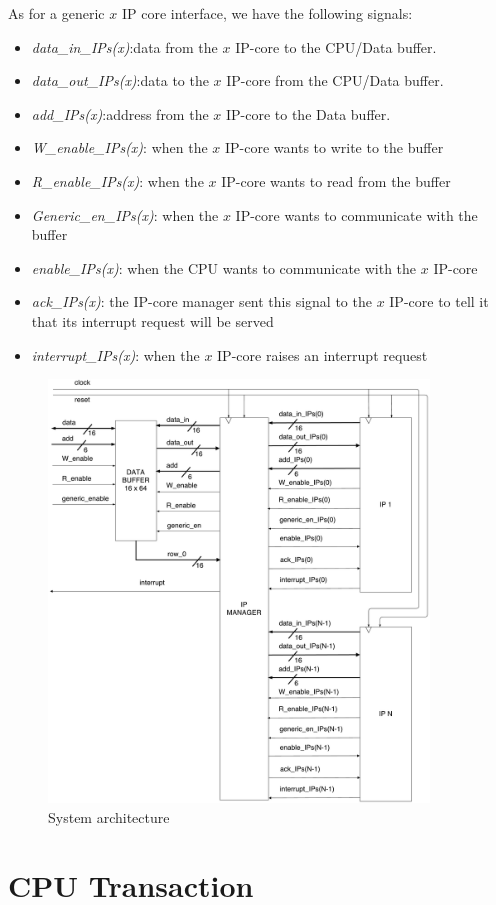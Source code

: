 	As for a generic $ x $ IP core interface, we have the following signals:
	\begin{itemize}
	\item \textit{data\_in\_IPs(x)}:data from the $ x $ IP-core to the CPU/Data buffer.
\item \textit{data\_out\_IPs(x)}:data to the $ x $ IP-core from the CPU/Data buffer.
\item \textit{add\_IPs(x)}:address from the $ x $ IP-core to the Data buffer.
\item \textit{W\_enable\_IPs(x)}: when the $ x $ IP-core wants to write to the buffer
\item \textit{R\_enable\_IPs(x)}: when the $ x $ IP-core wants to read from the buffer
\item \textit{Generic\_en\_IPs(x)}: when the $ x $ IP-core wants to communicate with the buffer	
\item \textit{enable\_IPs(x)}: when the CPU wants to communicate with the $ x $ IP-core
\item \textit{ack\_IPs(x)}: the IP-core manager sent this signal to the $ x $ IP-core to tell it that its interrupt request will be served
\item \textit{interrupt\_IPs(x)}: when the $ x $ IP-core raises an interrupt request
\end{itemize}
	\begin{figure}[h]
		\centering
		\includegraphics[width=0.9\textwidth]{chapters/figures/interface.pdf}  
		\caption{System architecture}
		\label{00fig}
	\end{figure}
\clearpage
\newpage
\section{CPU Transaction } \label{transaction}